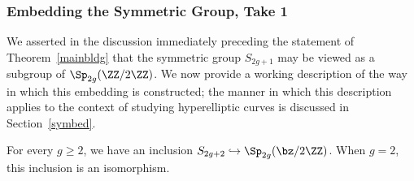 \subsubsection{Embedding the Symmetric Group, Take 1} \label{take1}

We asserted in the discussion immediately preceding the statement of Theorem~\ref{mainbldg} that the symmetric group $S_{2g+1}$ may be viewed as a subgroup of $\Sp_{2g}(\ZZ/2\ZZ)$. We now provide a working description of the way in which this embedding is constructed; the manner in which this description applies to the context of studying hyperelliptic curves is discussed in Section~\ref{symbed}.
\begin{lemma} \label{lemma:include-s}
For every $g \ge 2$, we have an inclusion $S_{2g+2} \hookrightarrow \Sp_{2g}(\bz /2 \ZZ)$.
When $g = 2$, this inclusion is an isomorphism. 
\end{lemma}
